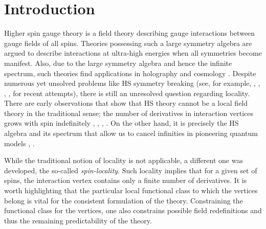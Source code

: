 \documentclass[12pt]{article}
\begin{document}
\section{Introduction}
Higher spin gauge theory is a field theory describing gauge interactions between gauge fields of all spins. Theories possessing such a large symmetry algebra are argued to describe interactions at ultra-high energies \cite{Vasiliev:2016xui} when all symmetries become manifest. Also, due to the large symmetry algebra and hence the infinite spectrum, such theories find applications in holography \cite{Klebanov:2002ja} and cosmology \cite{Barvinsky:2015wvz}. Despite numerous yet unsolved problems like HS symmetry breaking (see, for example, \cite{Didenko:2023txr}, \cite{Vasiliev:2018zer}, \cite{Silva:2021ece}, \cite{Alday:2015ota}, \cite{Maldacena:2012sf} for recent attempts), there is still an unresolved question regarding locality. There are early observations that show that HS theory cannot be a local field theory in the traditional sense; the number of derivatives in interaction vertices grows with spin indefinitely \cite{Bengtsson:1983pd}, \cite{Berends:1984wp}, \cite{Fradkin:1987ks}, \cite{Fradkin:1991iy}. On the other hand, it is precisely the HS algebra and its spectrum that allow us to cancel infinities in pioneering quantum models \cite{Giombi:2013fka}, \cite{Beccaria:2014xda}.

While the traditional notion of locality is not applicable, a different one was developed, the so-called {\it spin-locality}. Such locality implies that for a given set of spins, the interaction vertex contains only a finite number of derivatives. It is worth highlighting that the particular local functional class to which the vertices belong is vital for the consistent formulation of the theory. Constraining the functional class for the vertices, one also constrains possible field redefinitions and thus the remaining predictability of the theory.
\end{document}
